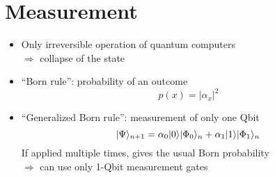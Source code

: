 \documentclass{../doc}
\begin{document}
  \section{Measurement}
    \begin{itemize}
      \item Only irreversible operation of quantum computers \\
        $\Rightarrow$ collapse of the state
      \item ``Born rule'': probability of an outcome
        \begin{equation}
          p(x) = |\alpha_x|^2
        \end{equation}
      \item ``Generalized Born rule'': measurement of only one Qbit
        \begin{equation}
          | \Psi \rangle_{n+1} = \alpha_0 | 0 \rangle | \Phi_0 \rangle_n + \alpha_1 | 1 \rangle | \Phi_1 \rangle_n
        \end{equation}
        If applied multiple times, gives the usual Born probability \\
        $\Rightarrow$ can use only 1-Qbit measurement gates
    \end{itemize}
\end{document}
